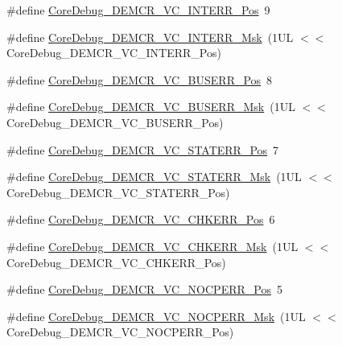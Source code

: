 \begin{DoxyCompactItemize}
\#define \hyperlink{group___c_m_s_i_s___core_debug_ga22079a6e436f23b90308be97e19cf07e}{Core\+Debug\+\_\+\+D\+E\+M\+C\+R\+\_\+\+V\+C\+\_\+\+I\+N\+T\+E\+R\+R\+\_\+\+Pos}~9
\item 
\#define \hyperlink{group___c_m_s_i_s___core_debug_gad6815d8e3df302d2f0ff2c2c734ed29a}{Core\+Debug\+\_\+\+D\+E\+M\+C\+R\+\_\+\+V\+C\+\_\+\+I\+N\+T\+E\+R\+R\+\_\+\+Msk}~(1\+U\+L $<$$<$ Core\+Debug\+\_\+\+D\+E\+M\+C\+R\+\_\+\+V\+C\+\_\+\+I\+N\+T\+E\+R\+R\+\_\+\+Pos)
\item 
\#define \hyperlink{group___c_m_s_i_s___core_debug_gab8e3d8f0f9590a51bbf10f6da3ad6933}{Core\+Debug\+\_\+\+D\+E\+M\+C\+R\+\_\+\+V\+C\+\_\+\+B\+U\+S\+E\+R\+R\+\_\+\+Pos}~8
\item 
\#define \hyperlink{group___c_m_s_i_s___core_debug_ga9d29546aefe3ca8662a7fe48dd4a5b2b}{Core\+Debug\+\_\+\+D\+E\+M\+C\+R\+\_\+\+V\+C\+\_\+\+B\+U\+S\+E\+R\+R\+\_\+\+Msk}~(1\+U\+L $<$$<$ Core\+Debug\+\_\+\+D\+E\+M\+C\+R\+\_\+\+V\+C\+\_\+\+B\+U\+S\+E\+R\+R\+\_\+\+Pos)
\item 
\#define \hyperlink{group___c_m_s_i_s___core_debug_ga16f0d3d2ce1e1e8cd762d938ac56c4ac}{Core\+Debug\+\_\+\+D\+E\+M\+C\+R\+\_\+\+V\+C\+\_\+\+S\+T\+A\+T\+E\+R\+R\+\_\+\+Pos}~7
\item 
\#define \hyperlink{group___c_m_s_i_s___core_debug_gaa38b947d77672c48bba1280c0a642e19}{Core\+Debug\+\_\+\+D\+E\+M\+C\+R\+\_\+\+V\+C\+\_\+\+S\+T\+A\+T\+E\+R\+R\+\_\+\+Msk}~(1\+U\+L $<$$<$ Core\+Debug\+\_\+\+D\+E\+M\+C\+R\+\_\+\+V\+C\+\_\+\+S\+T\+A\+T\+E\+R\+R\+\_\+\+Pos)
\item 
\#define \hyperlink{group___c_m_s_i_s___core_debug_ga10fc7c53bca904c128bc8e1a03072d50}{Core\+Debug\+\_\+\+D\+E\+M\+C\+R\+\_\+\+V\+C\+\_\+\+C\+H\+K\+E\+R\+R\+\_\+\+Pos}~6
\item 
\#define \hyperlink{group___c_m_s_i_s___core_debug_ga2f98b461d19746ab2febfddebb73da6f}{Core\+Debug\+\_\+\+D\+E\+M\+C\+R\+\_\+\+V\+C\+\_\+\+C\+H\+K\+E\+R\+R\+\_\+\+Msk}~(1\+U\+L $<$$<$ Core\+Debug\+\_\+\+D\+E\+M\+C\+R\+\_\+\+V\+C\+\_\+\+C\+H\+K\+E\+R\+R\+\_\+\+Pos)
\item 
\#define \hyperlink{group___c_m_s_i_s___core_debug_gac9d13eb2add61f610d5ced1f7ad2adf8}{Core\+Debug\+\_\+\+D\+E\+M\+C\+R\+\_\+\+V\+C\+\_\+\+N\+O\+C\+P\+E\+R\+R\+\_\+\+Pos}~5
\item 
\#define \hyperlink{group___c_m_s_i_s___core_debug_ga03ee58b1b02fdbf21612809034562f1c}{Core\+Debug\+\_\+\+D\+E\+M\+C\+R\+\_\+\+V\+C\+\_\+\+N\+O\+C\+P\+E\+R\+R\+\_\+\+Msk}~(1\+U\+L $<$$<$ Core\+Debug\+\_\+\+D\+E\+M\+C\+R\+\_\+\+V\+C\+\_\+\+N\+O\+C\+P\+E\+R\+R\+\_\+\+Pos)
$$
\end{DoxyCompactItemize}
